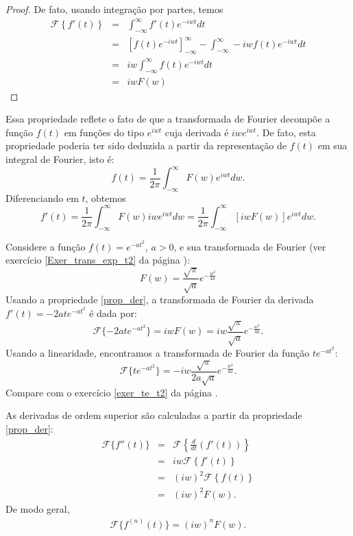 \begin{proof}
De fato, usando integração por partes, temos
\begin{eqnarray*}
\mathcal{F}\left\{f'(t)\right\}&=&\int_{-\infty}^\infty  f'(t)e^{-iwt}dt \\
&=&\left[f(t)e^{-iwt}\right]_{-\infty}^\infty- \int_{-\infty}^\infty  -iw f(t)e^{-iwt}dt \\
&=&iw\int_{-\infty}^\infty   f(t)e^{-iwt}dt \\
&=&iwF(w) 
\end{eqnarray*}
\end{proof}
\begin{obs}Essa propriedade reflete o fato de que a transformada de Fourier decompõe a função $f(t)$ em funções do tipo $e^{iwt}$ cuja derivada é $iwe^{iwt}$. De fato, esta propriedade poderia ter sido deduzida a partir da representação de $f(t)$ em sua integral de Fourier, isto é:
\begin{equation}
f(t)=\frac{1}{2\pi}\int_{-\infty}^\infty F(w)e^{iwt}dw.
\end{equation}
Diferenciando em $t$, obtemos
\begin{equation}
f'(t)=\frac{1}{2\pi}\int_{-\infty}^\infty F(w)iwe^{iwt}dw=\frac{1}{2\pi}\int_{-\infty}^\infty \left[iwF(w)\right]e^{iwt}dw.
\end{equation}
\end{obs}
\begin{ex}{\label{ex_exp_t2}}Considere a função $f(t)=e^{-at^2}$, $a>0$, e sua transformada de Fourier (ver exercício \ref{Exer_trans_exp_t2} da página \pageref{Exer_trans_exp_t2}):
\begin{equation}
F(w)=\frac{\sqrt{\pi}}{\sqrt{a}}e^{-\frac{w^2}{4a}}
\end{equation}
Usando a propriedade \ref{prop_der}, a transformada de Fourier da derivada $f'(t)=-2 a t e^{-at^2}$ é dada por:
\begin{equation}
\mathcal{F}\{-2 a t e^{-at^2} \}=iwF(w)=iw\frac{\sqrt{\pi}}{\sqrt{a}}e^{-\frac{w^2}{4a}}.
\end{equation}
Usando a linearidade, encontramos a transformada de Fourier da função $t e^{-at^2}$:
\begin{equation}
\mathcal{F}\{  t e^{-at^2} \}=-iw\frac{\sqrt{\pi}}{2a\sqrt{a}}e^{-\frac{w^2}{4a}}.
\end{equation}
Compare com o exercício \ref{exer_te_t2} da página \pageref{exer_te_t2}.
\end{ex}
\begin{obs}As derivadas de ordem superior são calculadas a partir da propriedade \ref{prop_der}:
\begin{eqnarray*}
\mathcal{F}\{f''(t)\}&=&\mathcal{F}\left\{\frac{d}{dt}\left(f'(t)\right)\right\}\\
&=&iw\mathcal{F}\left\{f'(t)\right\}\\
&=&(iw)^2\mathcal{F}\left\{f(t)\right\}\\
&=&(iw)^2F(w).
\end{eqnarray*}
De modo geral,
\begin{eqnarray*}
\mathcal{F}\{f^{(n)}(t)\}=(iw)^nF(w).
\end{eqnarray*}
\end{obs}
